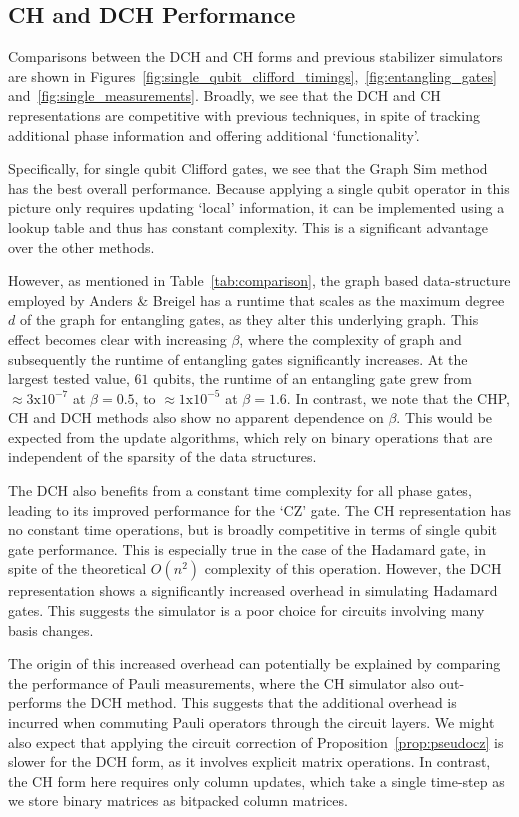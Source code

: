 \subsection*{CH and DCH Performance}
Comparisons between the DCH and CH forms and previous stabilizer simulators are shown in Figures~\ref{fig:single_qubit_clifford_timings},~\ref{fig:entangling_gates} and~\ref{fig:single_measurements}. Broadly, we see that the DCH and CH representations are competitive with previous techniques, in spite of tracking additional phase information and offering additional `functionality'.\par
Specifically, for single qubit Clifford gates, we see that the Graph Sim method has the best overall performance. Because applying a single qubit operator in this picture only requires updating `local' information, it can be implemented using a lookup table and thus has constant complexity. This is a significant advantage over the other methods.\par
However, as mentioned in Table~\ref{tab:comparison}, the graph based data-structure employed by Anders \& Breigel has a runtime that scales as the maximum degree $d$ of the graph for entangling gates, as they alter this underlying graph. This effect becomes clear with increasing $\beta$, where the complexity of graph and subsequently the runtime of entangling gates significantly increases. At the largest tested value, $61$ qubits, the runtime of an entangling gate grew from $\approx 3\mathrm{x}10^{-7}$ at $\beta=0.5$, to $\approx 1\mathrm{x}10^{-5}$ at $\beta=1.6$. In contrast, we note that the CHP, CH and DCH methods also show no apparent dependence on $\beta$. This would be expected from the update algorithms, which rely on binary operations that are independent of the sparsity of the data structures.\par
The DCH also benefits from a constant time complexity for all phase gates, leading to its improved performance for the `CZ' gate. The CH representation has no constant time operations, but is broadly competitive in terms of single qubit gate performance. This is especially true in the case of the Hadamard gate, in spite of the theoretical $O(n^{2})$ complexity of this operation. However, the DCH representation shows a significantly increased overhead in simulating Hadamard gates. This suggests the simulator is a poor choice for circuits involving many basis changes.\par
The origin of this increased overhead can potentially be explained by comparing the performance of Pauli measurements, where the CH simulator also out-performs the DCH method. This suggests that the additional overhead is incurred when commuting Pauli operators through the circuit layers. We might also expect that applying the circuit correction of Proposition~\ref{prop:pseudocz} is slower for the DCH form, as it involves explicit matrix operations. In contrast, the CH form here requires only column updates, which take a single time-step as we store binary matrices as bitpacked column matrices.\par
